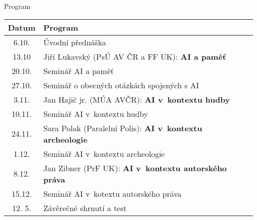 \begin{frame}{Program}

    \small\centering
    \begin{tabular}{cl}
        \toprule
    Datum   &   Program \\ \midrule
     6.10. & Úvodní přednáška \\ \midrule

    13.10  & Jiří Lukavský (PsÚ AV ČR a FF UK): \hfill \textbf{AI a paměť}  \\
    20.10. & Seminář AI a paměť \\ \midrule

	27.10. & Seminář o obecných otázkách spojených s AI \\ \midrule

	 3.11. & Jan Hajič jr. (MÚA AVČR): \hfill \textbf{AI v~kontextu hudby} \\
    10.11. & Seminář AI v~kontextu hudby \\ \midrule

	24.11. & Sara Polak (Paralelní Polis): \hfill \textbf{AI v~kontextu archeologie} \\
	 1.12. & Seminář AI v~kontextu archeologie \\ \midrule

        8.12. & Jan Zibner (PrF UK): \hspace{50pt} \textbf{AI v~kontextu autorského práva} \\
	15.12. & Seminář AI v~kotextu autorského práva \\ \midrule

    12. 5.  & Závěrečné shrnutí a test \\
    \bottomrule
    \end{tabular}

\end{frame}
